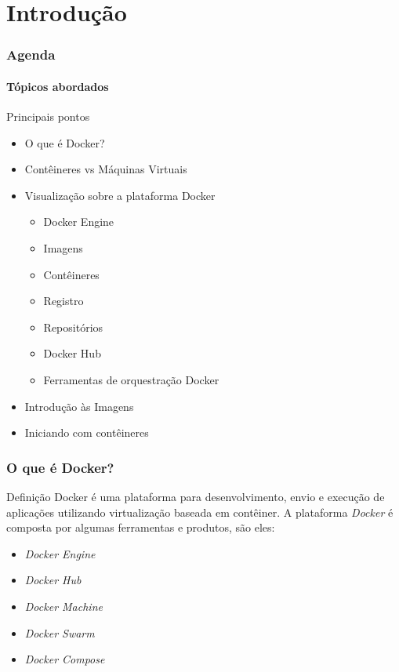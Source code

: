\documentclass[12pt]{beamer}
\begin{document}
\section{Introdução}
\begin{frame}
  \frametitle{Agenda}
  \framesubtitle{Tópicos abordados}
  \begin{block}{Principais pontos}
					\begin{itemize}
									\item <2->O que é Docker?
									\item <3->Contêineres vs Máquinas Virtuais
									\item <4->Visualização sobre a plataforma Docker
													\begin{itemize}
																	\item <5->Docker Engine
																	\item <6->Imagens
																	\item <7->Contêineres
																	\item <8->Registro
																	\item <9->Repositórios
																	\item <10->Docker Hub
																	\item <11->Ferramentas de orquestração Docker
													\end{itemize}
									\item <12->Introdução às Imagens
									\item <13->Iniciando com contêineres
  				\end{itemize}
  \end{block}
\end{frame}

\begin{frame}
  \frametitle{O que é Docker?}
  \begin{block}{Definição}
					Docker é uma plataforma para desenvolvimento, envio e execução de
					aplicações utilizando virtualização baseada em contêiner.
					A plataforma \emph{Docker} é composta por algumas ferramentas e
					produtos, são eles:
  \begin{itemize}
					\item <2->\emph{Docker Engine}
					\item <3->\emph{Docker Hub}
					\item <4->\emph{Docker Machine}
					\item <5->\emph{Docker Swarm}
					\item <6->\emph{Docker Compose}
  \end{itemize}
  \end{block}
\end{frame}
\end{document}
